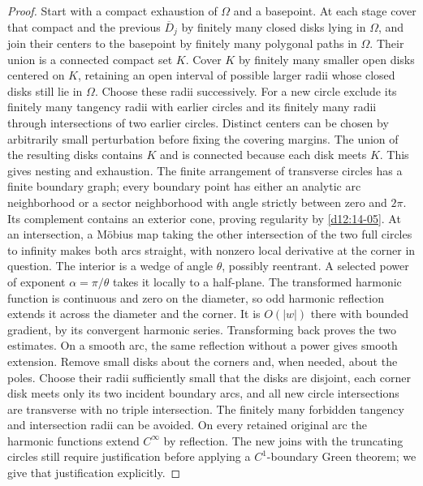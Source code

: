 \documentclass[11pt,a4paper,openany]{book}
\theoremstyle{definition}
\theoremstyle{remark}\newtheorem{remark}[theorem]{Remark}
\begin{document}
\begin{proof}
Start with a compact exhaustion of $\Omega$ and a basepoint. At each stage cover that compact and the previous $\overline D_j$ by finitely many closed disks lying in $\Omega$, and join their centers to the basepoint by finitely many polygonal paths in $\Omega$. Their union is a connected compact set $K$. Cover $K$ by finitely many smaller open disks centered on $K$, retaining an open interval of possible larger radii whose closed disks still lie in $\Omega$. Choose these radii successively. For a new circle exclude its finitely many tangency radii with earlier circles and its finitely many radii through intersections of two earlier circles. Distinct centers can be chosen by arbitrarily small perturbation before fixing the covering margins. The union of the resulting disks contains $K$ and is connected because each disk meets $K$. This gives nesting and exhaustion. The finite arrangement of transverse circles has a finite boundary graph; every boundary point has either an analytic arc neighborhood or a sector neighborhood with angle strictly between zero and $2\pi$. Its complement contains an exterior cone, proving regularity by \cref{d12:14-05}.
At an intersection, a M\"obius map taking the other intersection of the two full circles to infinity makes both arcs straight, with nonzero local derivative at the corner in question. The interior is a wedge of angle $\theta$, possibly reentrant. A selected power of exponent $\alpha=\pi/\theta$ takes it locally to a half-plane. The transformed harmonic function is continuous and zero on the diameter, so odd harmonic reflection extends it across the diameter and the corner. It is $O(|w|)$ there with bounded gradient, by its convergent harmonic series. Transforming back proves the two estimates. On a smooth arc, the same reflection without a power gives smooth extension.
Remove small disks about the corners and, when needed, about the poles. Choose their radii sufficiently small that the disks are disjoint, each corner disk meets only its two incident boundary arcs, and all new circle intersections are transverse with no triple intersection. The finitely many forbidden tangency and intersection radii can be avoided. On every retained original arc the harmonic functions extend $C^\infty$ by reflection. The new joins with the truncating circles still require justification before applying a $C^1$-boundary Green theorem; we give that justification explicitly.


\end{proof}
\end{document}
